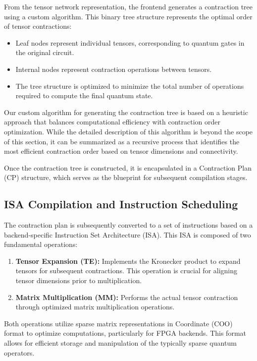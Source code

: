 \documentclass[12pt,oneside,a4paper]{article}
\begin{document}
From the tensor network representation, the frontend generates a contraction tree using a custom algorithm. This binary tree structure represents the optimal order of tensor contractions:

\begin{itemize}
    \item Leaf nodes represent individual tensors, corresponding to quantum gates in the original circuit.
    \item Internal nodes represent contraction operations between tensors.
    \item The tree structure is optimized to minimize the total number of operations required to compute the final quantum state.
\end{itemize}

Our custom algorithm for generating the contraction tree is based on a heuristic approach that balances computational efficiency with contraction order optimization. While the detailed description of this algorithm is beyond the scope of this section, it can be summarized as a recursive process that identifies the most efficient contraction order based on tensor dimensions and connectivity.

Once the contraction tree is constructed, it is encapsulated in a Contraction Plan (CP) structure, which serves as the blueprint for subsequent compilation stages.

\subsection{ISA Compilation and Instruction Scheduling}

The contraction plan is subsequently converted to a set of instructions based on a backend-specific Instruction Set Architecture (ISA). This ISA is composed of two fundamental operations:

\begin{enumerate}
    \item \textbf{Tensor Expansion (TE):} Implements the Kronecker product to expand tensors for subsequent contractions. This operation is crucial for aligning tensor dimensions prior to multiplication.
    \item \textbf{Matrix Multiplication (MM):} Performs the actual tensor contraction through optimized matrix multiplication operations.
\end{enumerate}

Both operations utilize sparse matrix representations in Coordinate (COO) format to optimize computations, particularly for FPGA backends. This format allows for efficient storage and manipulation of the typically sparse quantum operators.
\end{document}
